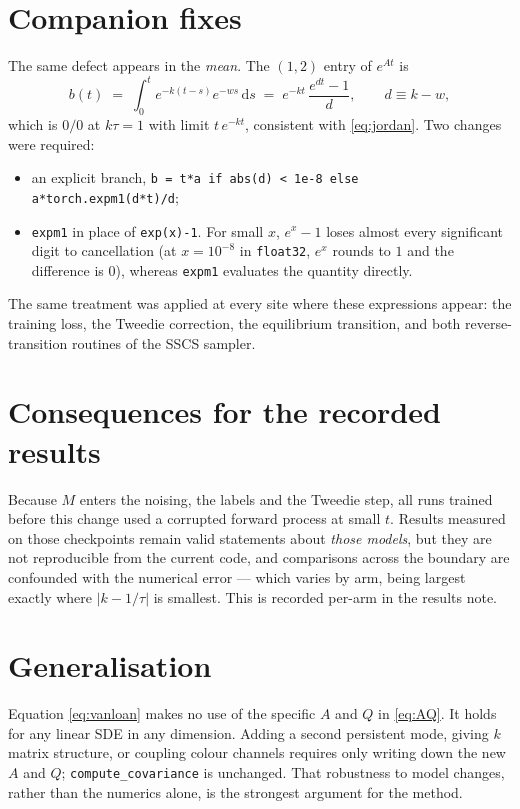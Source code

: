 \documentclass[11pt]{article}
\newcommand{\kk}{k}
\newcommand{\tauu}{\tau}
\newcommand{\dd}{\mathrm{d}}
\begin{document}
\section{Companion fixes}

The same defect appears in the \emph{mean}. The $(1,2)$ entry of $e^{At}$ is
\begin{equation}
b(t) \;=\; \int_0^t e^{-\kk(t-s)}e^{-ws}\,\dd s
      \;=\; e^{-\kk t}\,\frac{e^{dt}-1}{d},\qquad d \equiv \kk - w,
\end{equation}
which is $0/0$ at $\kk\tauu=1$ with limit $t\,e^{-\kk t}$, consistent with
\eqref{eq:jordan}. Two changes were required:
\begin{itemize}\itemsep2pt
\item an explicit branch, \texttt{b = t*a if abs(d) < 1e-8 else a*torch.expm1(d*t)/d};
\item \texttt{expm1} in place of \texttt{exp(x)-1}. For small $x$, $e^{x}-1$ loses almost
      every significant digit to cancellation (at $x=10^{-8}$ in \texttt{float32},
      $e^{x}$ rounds to $1$ and the difference is $0$), whereas \texttt{expm1} evaluates
      the quantity directly.
\end{itemize}
The same treatment was applied at every site where these expressions appear: the training
loss, the Tweedie correction, the equilibrium transition, and both reverse-transition
routines of the SSCS sampler.

\section{Consequences for the recorded results}

Because $M$ enters the noising, the labels and the Tweedie step, all runs trained before
this change used a corrupted forward process at small $t$. Results measured on those
checkpoints remain valid statements about \emph{those models}, but they are not
reproducible from the current code, and comparisons across the boundary are confounded with
the numerical error --- which varies by arm, being largest exactly where $|\kk-1/\tauu|$ is
smallest. This is recorded per-arm in the results note.

\section{Generalisation}

Equation \eqref{eq:vanloan} makes no use of the specific $A$ and $Q$ in \eqref{eq:AQ}. It
holds for any linear SDE in any dimension. Adding a second persistent mode, giving $\kk$
matrix structure, or coupling colour channels requires only writing down the new $A$ and
$Q$; \texttt{compute\_covariance} is unchanged. That robustness to model changes, rather
than the numerics alone, is the strongest argument for the method.
\end{document}
